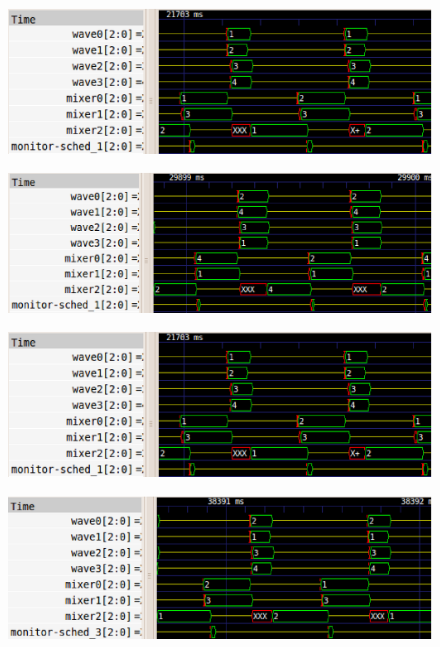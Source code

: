 \newpage

\begin{figure}[htbp]
\centering
\includegraphics[width=\widefigure]{images/32KB_Xeon.eps}
\caption{}
\label{fig:trace_xeon}
\end{figure}

\begin{figure}[htbp]
\centering
\includegraphics[width=\widefigure]{images/32KB_i7.eps}
\caption{}
\label{fig:trace_i7}
\end{figure}

\begin{figure}[htbp]
\centering
\includegraphics[width=\widefigure]{images/32KB_Xeon.eps}
\caption{}
\label{fig:trace_xeon}
\end{figure}

\begin{figure}[htbp]
\centering
\includegraphics[width=\widefigure]{images/64KB_Xeon.eps}
\caption{}
\label{fig:trace_xeon}
\end{figure}


